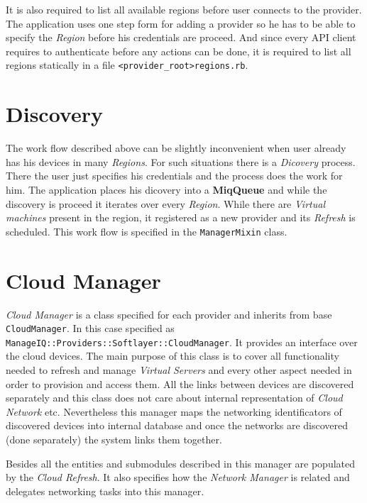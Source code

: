 It is also required to list all available regions before user connects to the provider. The application uses one step form for adding a provider so he has to be able to specify the \emph{Region} before his credentials are proceed. And since every API client requires to authenticate before any actions can be done, it is required to list all regions statically in a file \verb|<provider_root>regions.rb|.

\section{Discovery}
\label{sec:Discovery}

The work flow described above can be slightly inconvenient when user already has his devices in many \emph{Regions}. For such situations there is a \emph{Dicovery} process. There the user just specifies his credentials and the process does the work for him. The application places his dicovery into a \textbf{MiqQueue} and while the discovery is proceed it iterates over every \emph{Region}. While there are \emph{Virtual machines} present in the region, it registered as a new provider and its \emph{Refresh} is scheduled. This work flow is specified in the \verb|ManagerMixin| class.

\section{Cloud Manager}
\label{sec:Cloud Manager}

\emph{Cloud Manager} is a class specified for each provider and inherits from base \verb|CloudManager|. In this case specified as \verb|ManageIQ::Providers::Softlayer::CloudManager|. It provides an interface over the cloud devices. The main purpose of this class is to cover all functionality needed to refresh and manage \emph{Virtual Servers} and every other aspect needed in order to provision and access them. All the links between devices are discovered separately and this class does not care about internal representation of \emph{Cloud Network} etc. Nevertheless this manager maps the networking identificators of discovered devices into internal database and once the networks are discovered (done separately) the system links them together.

Besides all the entities and submodules described in this manager are populated by the \emph{Cloud Refresh}. It also specifies how the \emph{Network Manager} is related and delegates networking tasks into this manager.

